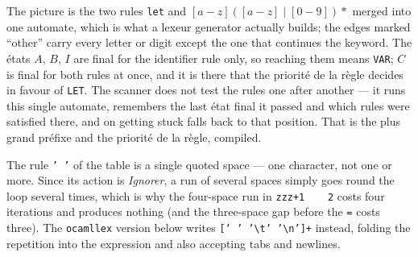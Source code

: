 \begin{figure}[h!]
  \centering
\end{figure}

The picture is the two rules \texttt{let} and $[a-z]([a-z]\mid[0-9]){*}$ merged
into one automate, which is what a lexeur generator actually builds; the edges
marked ``other'' carry every letter or digit except the one that continues the
keyword. The états $A$, $B$, $I$ are final for the identifier rule only, so
reaching them means \texttt{VAR}; $C$ is final for both rules at once, and it is
there that the priorité de la règle decides in favour of \texttt{LET}. The
scanner does not test the rules one after another --- it runs this single
automate, remembers the last état final it passed and which rules were
satisfied there, and on getting stuck falls back to that position. That is the
plus grand préfixe and the priorité de la règle, compiled.

\begin{remark}
  The rule \texttt{'\ '} of the table is a single quoted space --- one character,
  not one or more. Since its action is \emph{Ignorer}, a run of several spaces
  simply goes round the loop several times, which is why the four-space run in
  \texttt{zzz+1\ \ \ \ 2} costs four iterations and produces nothing (and the
  three-space gap before the \texttt{=} costs three). The
  \texttt{ocamllex} version below writes \texttt{[' ' '\textbackslash t'
  '\textbackslash n']+} instead, folding the repetition into the expression and
  also accepting tabs and newlines.
\end{remark}

